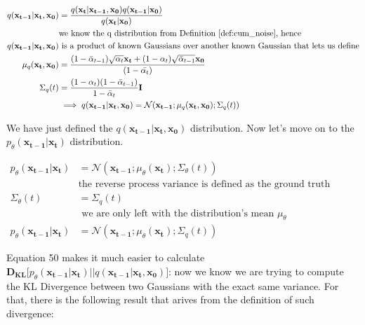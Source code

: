 \documentclass{article}
\begin{document}
\begin{align}
	 q(\mathbf{x_{t-1} | x_t,  x_0}) &= \frac{q(\mathbf{x_t | x_{t-1}, x_0}) q(\mathbf{x_{t-1}|x_0})}{q(\mathbf{x_t | x_0})} \\
	 & \text{we know the q distribution from Definition \ref{def:cum_noise}, hence } \\ 
	 q(\mathbf{x_{t-1} | x_t,  x_0}) &\text{    is a product of known Gaussians over another known Gaussian that lets us define} \\
	 \mu_q(\mathbf{x_t, x_0}) &= \frac{(1-\bar{\alpha}_{t-1})\sqrt{\alpha_t} \mathbf{x_t} + (1- \alpha_t) \sqrt{\bar{\alpha}_{t-1}  } \mathbf{x_0}}{(1-\bar{\alpha_t})} \\
	 \Sigma_q(t) &= \frac{(1-\alpha_t)(1-\bar{\alpha}_{t-1})}{1 - \bar{\alpha}_t}  \mathbf{I} \\
	 & \implies  q(\mathbf{x_{t-1} | x_t,  x_0}) =   \mathcal{N}(\mathbf{x_{t-1}};  \mu_q(\mathbf{x_t, x_0}); \Sigma_q(t))
\end{align}

We have just defined the $q(\mathbf{x_{t-1} | x_t,  x_0})$ distribution. Now let's move on to the  $p_\theta (\mathbf{x_{t-1} | x_t})$ distribution.
	
\begin{align}
	p_\theta(\mathbf{x_{t-1} | x_t}) &=   \mathcal{N}(\mathbf{x_{t-1}};  \mu_\theta(\mathbf{x_t}); \Sigma_\theta(t)) \\
	& \text{the reverse process variance is defined as the ground truth variance of the forward process: } \\
 \Sigma_\theta(t) &= \Sigma_q(t) \\
	& \text{    we are only left with the distribution's mean   } \mu_\theta \\
	p_\theta(\mathbf{x_{t-1} | x_t}) &=   \mathcal{N}(\mathbf{x_{t-1}};  \mu_\theta(\mathbf{x_t}); \Sigma_q(t))
\end{align}

Equation 50 makes it much easier to calculate $\mathbf{D_{KL}}\big[ p_\theta (\mathbf{x_{t-1} | x_t})  || q(\mathbf{x_{t-1} | x_t,  x_0}) \big]$: now we know we are trying to compute the KL Divergence between two Gaussians with the exact same variance. For that,  there is the following result that arives from the definition of such divergence:
\end{document}
